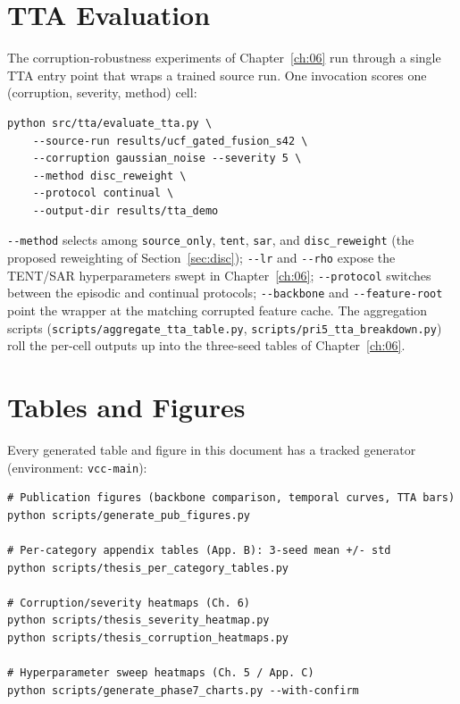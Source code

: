 \section{TTA Evaluation}
\label{sec:appe-tta}

The corruption-robustness experiments of Chapter~\ref{ch:06} run through a
single TTA entry point that wraps a trained source run. One invocation scores
one (corruption, severity, method) cell:

\begin{verbatim}
python src/tta/evaluate_tta.py \
    --source-run results/ucf_gated_fusion_s42 \
    --corruption gaussian_noise --severity 5 \
    --method disc_reweight \
    --protocol continual \
    --output-dir results/tta_demo
\end{verbatim}

\texttt{-{}-method} selects among \texttt{source\_only}, \texttt{tent},
\texttt{sar}, and \texttt{disc\_reweight} (the proposed reweighting of
Section~\ref{sec:disc}); \texttt{-{}-lr} and \texttt{-{}-rho} expose the
TENT/SAR hyperparameters swept in Chapter~\ref{ch:06};
\texttt{-{}-protocol} switches between the episodic and continual protocols;
\texttt{-{}-backbone} and \texttt{-{}-feature-root} point the wrapper at the
matching corrupted feature cache. The aggregation scripts
(\texttt{scripts/aggregate\_tta\_table.py},
\texttt{scripts/pri5\_tta\_breakdown.py}) roll the per-cell outputs up into
the three-seed tables of Chapter~\ref{ch:06}.

\section{Tables and Figures}
\label{sec:appe-figures}

Every generated table and figure in this document has a tracked generator
(environment: \texttt{vcc-main}):

\begin{verbatim}
# Publication figures (backbone comparison, temporal curves, TTA bars)
python scripts/generate_pub_figures.py

# Per-category appendix tables (App. B): 3-seed mean +/- std
python scripts/thesis_per_category_tables.py

# Corruption/severity heatmaps (Ch. 6)
python scripts/thesis_severity_heatmap.py
python scripts/thesis_corruption_heatmaps.py

# Hyperparameter sweep heatmaps (Ch. 5 / App. C)
python scripts/generate_phase7_charts.py --with-confirm
\end{verbatim}

